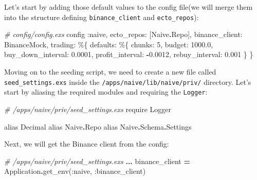 \documentclass[
]{book}
\newenvironment{Shaded}{\begin{snugshade}}{\end{snugshade}}
\newcommand{\CommentTok}[1]{\textcolor[rgb]{0.56,0.35,0.01}{\textit{#1}}}
\newcommand{\ConstantTok}[1]{\textcolor[rgb]{0.00,0.00,0.00}{#1}}
\newcommand{\DecValTok}[1]{\textcolor[rgb]{0.00,0.00,0.81}{#1}}
\newcommand{\FloatTok}[1]{\textcolor[rgb]{0.00,0.00,0.81}{#1}}
\newcommand{\ImportTok}[1]{#1}
\newcommand{\NormalTok}[1]{#1}
\newcommand{\OperatorTok}[1]{\textcolor[rgb]{0.81,0.36,0.00}{\textbf{#1}}}
\newcommand{\VariableTok}[1]{\textcolor[rgb]{0.00,0.00,0.00}{#1}}
\begin{document}
Let's start by adding those default values to the config file(we will merge them into the structure defining \texttt{binance\_client} and \texttt{ecto\_repos}):

\begin{Shaded}
\begin{Highlighting}[]
\CommentTok{\# config/config.exs}
\NormalTok{config }\VariableTok{:naive}\NormalTok{,}
  \VariableTok{ecto\_repos:}\NormalTok{ [}\ConstantTok{Naive}\OperatorTok{.}\ConstantTok{Repo}\NormalTok{],}
  \VariableTok{binance\_client:} \ConstantTok{BinanceMock}\NormalTok{,}
  \VariableTok{trading:}\NormalTok{ \%\{}
    \VariableTok{defaults:}\NormalTok{ \%\{}
      \VariableTok{chunks:} \DecValTok{5}\NormalTok{,}
      \VariableTok{budget:} \FloatTok{1000.0}\NormalTok{,}
      \VariableTok{buy\_down\_interval:} \FloatTok{0.0001}\NormalTok{,}
      \VariableTok{profit\_interval:} \OperatorTok{{-}}\FloatTok{0.0012}\NormalTok{,}
      \VariableTok{rebuy\_interval:} \FloatTok{0.001}
\NormalTok{    \}}
\NormalTok{  \}}
\end{Highlighting}
\end{Shaded}

Moving on to the seeding script, we need to create a new file called \texttt{seed\_settings.exs} inside the \texttt{/apps/naive/lib/naive/priv/} directory. Let's start by aliasing the required modules and requiring the \texttt{Logger}:

\begin{Shaded}
\begin{Highlighting}[]
\CommentTok{\# /apps/naive/priv/seed\_settings.exs}
\ImportTok{require} \ConstantTok{Logger}

\ImportTok{alias} \ConstantTok{Decimal}
\ImportTok{alias} \ConstantTok{Naive}\OperatorTok{.}\ConstantTok{Repo}
\ImportTok{alias} \ConstantTok{Naive}\OperatorTok{.}\ConstantTok{Schema}\OperatorTok{.}\ConstantTok{Settings}
\end{Highlighting}
\end{Shaded}

Next, we will get the Binance client from the config:

\begin{Shaded}
\begin{Highlighting}[]
\CommentTok{\# /apps/naive/priv/seed\_settings.exs}
\OperatorTok{...}
\NormalTok{binance\_client }\OperatorTok{=} \ConstantTok{Application}\OperatorTok{.}\NormalTok{get\_env(}\VariableTok{:naive}\NormalTok{, }\VariableTok{:binance\_client}\NormalTok{)}
\end{Highlighting}
\end{Shaded}
\end{document}
